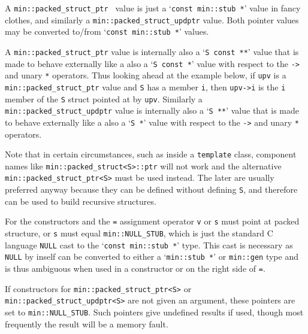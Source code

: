 \documentclass[12pt]{article}
\newcommand{\EOL}{\penalty \exhyphenpenalty}
\begin{document}
A {\tt min::\EOL packed\_\EOL struct\_\EOL ptr \SARG} value is just
a `{\tt const min::stub~*}' value in fancy clothes,
and similarly a {\tt min::\EOL packed\_\EOL struct\_\EOL updptr\SARG} value.
Both pointer values may be converted to/from
`{\tt const min::stub~*}' values.

A {\tt min::\EOL packed\_\EOL struct\_\EOL ptr\SARG} value is internally
also a `\verb|S const **|' value that is made to behave externally like a
also a `\verb|S const *|' value with respect to the \verb|->| and
unary \verb|*| operators.  Thus looking ahead at the example below,
if \verb|upv| is a
{\tt min::\EOL packed\_\EOL struct\_\EOL ptr\SARG} value
and \verb|S| has a member \verb|i|, then \verb|upv->i| is the \verb|i|
member of the \verb|S| struct pointed at by \verb|upv|.
Similarly a {\tt min::\EOL packed\_\EOL struct\_\EOL updptr\SARG} value
is internally also a `\verb|S **|' value that is made to behave
externally like a also a `\verb|S *|' value with respect to the \verb|->| and
unary \verb|*| operators.

Note that in certain
circumstances, such as inside a {\tt template} class,
component names like {\tt min::\EOL packed\_\EOL struct<S>::ptr} will not work
and the alternative {\tt min::\EOL packed\_\EOL struct\_\EOL ptr<S>}
must be used instead.  The later are usually preferred anyway because
they can be defined without defining \verb|S|, and therefore can be
used to build recursive structures.

For the constructors and the {\tt =} assignment operator \verb|v| or
\verb|s| must point at packed structure, or \verb|s| must equal
\verb|min::NULL_STUB|, which is just the standard C language \verb|NULL|
cast to the `\verb|const min::stub *|' type.  This cast is necessary
as \verb|NULL| by inself can be converted to either a `\verb|min::stub *|'
or \verb|min::gen| type and is thus ambiguous when used in a constructor
or on the right side of \verb|=|.

If constructors for {\tt min::\EOL packed\_\EOL struct\_\EOL ptr<S>} or
{\tt min::\EOL packed\_\EOL struct\_\EOL updptr<S>} are
not given an argument, these pointers are set to
\verb|min::NULL_STUB|.  Such pointers give undefined results if
used, though most frequently the result will be a memory fault.
\end{document}
